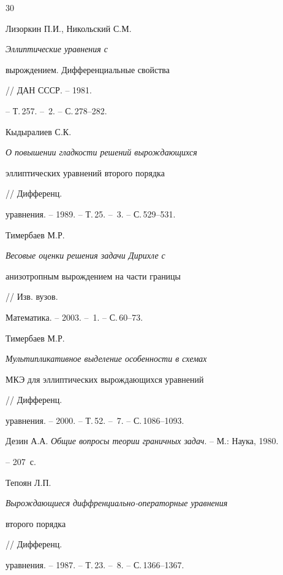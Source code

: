\begin{thebibliography}{30}







Лизоркин П.И., Никольский С.М. {\em Эллиптические уравнения с


вырождением. Дифференциальные свойства} // ДАН СССР. -- 1981.


-- Т.\,257. -- \No\,2. -- С.\,278--282.







Кыдыралиев С.К. {\em О повышении гладкости решений вырождающихся


эллиптических уравнений второго порядка} // Дифференц.


уравнения. -- 1989. -- Т.\,25. -- \No\,3. -- С.\,529--531.







Тимербаев М.Р. {\em Весовые оценки решения задачи Дирихле с


анизотропным вырождением на части границы} // Изв. вузов.


Математика. -- 2003. -- \No\,1. -- С.\,60--73.







Тимербаев М.Р. {\em Мультипликативное выделение особенности в схемах


МКЭ для эллиптических вырождающихся уравнений} // Дифференц.


уравнения. -- 2000. -- Т.\,52. -- \No\,7. -- С.\,1086--1093.







Дезин А.А. {\em Общие вопросы теории граничных задач}. -- М.: Наука, 1980.


-- 207~с.







Тепоян Л.П. {\em Вырождающиеся диффренциально-операторные уравнения


второго порядка} // Дифференц.


уравнения. -- 1987. -- Т.\,23. -- \No\,8. -- С.\,1366--1367.






\end{thebibliography}
